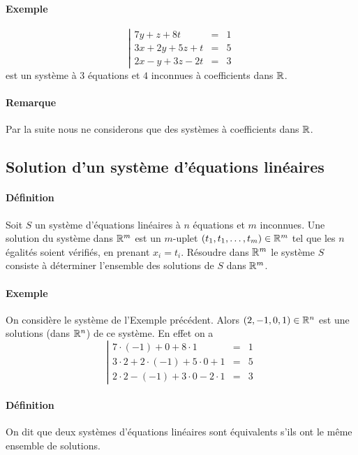 \paragraph{Exemple}
$$\left\vert \begin{array}{rcl}
  7 y + z + 8 t & = & 1 \\
  3 x + 2 y + 5 z + t & = & 5 \\
  2 x - y + 3 z - 2 t & = & 3
\end{array} \right.$$
est un système à $3$ équations et $4$ inconnues à coefficients dans $\mathbb{R}$.

\paragraph{Remarque} Par la suite nous ne considerons que des systèmes à coefficients dans $\mathbb{R}$.

%
\subsection{Solution d'un système d'équations linéaires}
%
\paragraph{Définition} Soit $S$ un système d'équations linéaires à $n$ équations et $m$ inconnues. Une solution du système dans $\mathbb{R}^m$ est un $m$-uplet $(t_1, t_1, \ldots, t_m) \in \mathbb{R}^m$ tel que les $n$ égalités soient vérifiés, en prenant $x_i = t_i$. Résoudre dans $\mathbb{R}^m$ le système $S$ consiste à déterminer l'ensemble des solutions de $S$ dans $\mathbb{R}^m$.

\paragraph{Exemple} On considère le système de l'Exemple précédent. Alors $(2, -1, 0, 1) \in \mathbb{R}^n$ est une solutions (dans $\mathbb{R}^n$) de ce système. En effet on a
$$\left\vert \begin{array}{rcl}
  7 \cdot (-1) + 0 + 8 \cdot 1 & = & 1 \\
  3 \cdot 2 + 2 \cdot (-1) + 5 \cdot 0 + 1 & = & 5 \\
  2 \cdot 2 - (-1) + 3 \cdot 0 - 2 \cdot 1 & = & 3
\end{array} \right.$$

\paragraph{Définition} On dit que deux systèmes d'équations linéaires sont équivalents s'ils ont le même ensemble de solutions.

